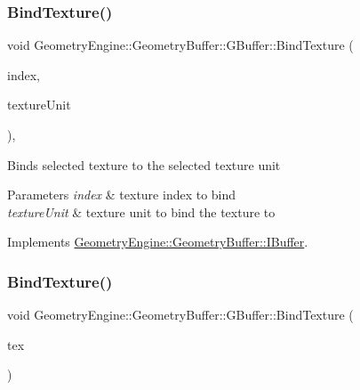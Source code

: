\subsubsection{\texorpdfstring{BindTexture()}{BindTexture()}\hspace{0.1cm}{\footnotesize\ttfamily [2/4]}}
{\footnotesize\ttfamily void Geometry\+Engine\+::\+Geometry\+Buffer\+::\+G\+Buffer\+::\+Bind\+Texture (\begin{DoxyParamCaption}\item[{unsigned int}]{index,  }\item[{unsigned int}]{texture\+Unit }\end{DoxyParamCaption})\hspace{0.3cm}{\ttfamily [override]}, {\ttfamily [virtual]}}

Binds selected texture to the selected texture unit 
\begin{DoxyParams}{Parameters}
{\em index} & texture index to bind \\
\hline
{\em texture\+Unit} & texture unit to bind the texture to \\
\hline
\end{DoxyParams}


Implements \mbox{\hyperlink{class_geometry_engine_1_1_geometry_buffer_1_1_i_buffer_a7fdf65d272575189e26ca13d169e8317}{Geometry\+Engine\+::\+Geometry\+Buffer\+::\+I\+Buffer}}.

\mbox{\label{class_geometry_engine_1_1_geometry_buffer_1_1_g_buffer_a6a2469afe0c79b97d35ba5d2b6a1ae52}} 
\subsubsection{\texorpdfstring{BindTexture()}{BindTexture()}\hspace{0.1cm}{\footnotesize\ttfamily [3/4]}}
{\footnotesize\ttfamily void Geometry\+Engine\+::\+Geometry\+Buffer\+::\+G\+Buffer\+::\+Bind\+Texture (\begin{DoxyParamCaption}\item[{\mbox{\hyperlink{class_geometry_engine_1_1_geometry_buffer_1_1_g_buffer_a718dceafcac1915f7de061108597e1cc}{G\+B\+U\+F\+F\+E\+R\+\_\+\+T\+E\+X\+T\+U\+R\+E\+\_\+\+T\+Y\+PE}}}]{tex }\end{DoxyParamCaption})}

